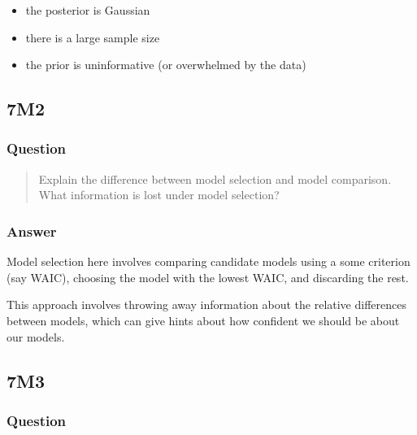 \documentclass[
]{book}
\providecommand{\tightlist}{%
  \setlength{\itemsep}{0pt}\setlength{\parskip}{0pt}}
\begin{document}
\begin{itemize}
\tightlist
\item
  the posterior is Gaussian
\item
  there is a large sample size
\item
  the prior is uninformative (or overwhelmed by the data)
\end{itemize}

\hypertarget{m2-4}{%
\subsection*{7M2}\label{m2-4}}

\hypertarget{question-65}{%
\subsubsection*{Question}\label{question-65}}

\begin{quote}
Explain the difference between model selection and model comparison. What information is lost under model selection?
\end{quote}

\hypertarget{answer-65}{%
\subsubsection*{Answer}\label{answer-65}}

Model selection here involves comparing candidate models using a some criterion (say WAIC), choosing the model with the lowest WAIC, and discarding the rest.

This approach involves throwing away information about the relative differences between models, which can give hints about how confident we should be about our models.

\hypertarget{m3-4}{%
\subsection*{7M3}\label{m3-4}}

\hypertarget{question-66}{%
\subsubsection*{Question}\label{question-66}}
\end{document}
